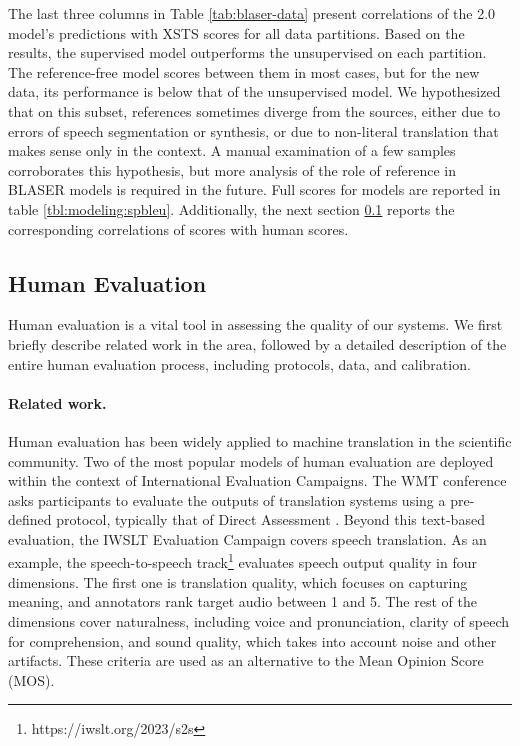 The last three columns in Table \ref{tab:blaser-data} present correlations of the 2.0 model's predictions with XSTS scores for all data partitions. Based on the results, the supervised model outperforms the unsupervised on each partition. The reference-free model scores between them in most cases, but for the new \sst data, its performance is below that of the unsupervised model. We hypothesized that on this subset, references sometimes diverge from the sources, either due to errors of speech segmentation or synthesis, or due to non-literal translation that makes sense only in the context. A manual examination of a few samples corroborates this hypothesis, but more analysis of the role of reference in BLASER models is required in the future.
Full \blaser scores for \mfourt models are reported in table \ref{tbl:modeling:spbleu}. Additionally, the next section \ref{subsec:appendix:humanmetrics} reports the corresponding correlations of \blaser scores with human scores.






\subsection{Human Evaluation}
\label{subsec:appendix:humanmetrics}


Human evaluation is a vital tool in assessing the quality of our systems. We first briefly describe related work in the area, followed by a detailed description of the entire human evaluation process, including protocols, data, and calibration. 

\paragraph{Related work.} Human evaluation has been widely applied to machine translation in the scientific community. Two of the most popular models of human evaluation are deployed within the context of International Evaluation Campaigns. The WMT conference \citep{kocmi-EtAl:2022:WMT} asks participants to evaluate the outputs of translation systems using a pre-defined protocol, typically that of Direct Assessment \citep{grahametal2013directassessment}.  
Beyond this text-based evaluation, the IWSLT Evaluation Campaign covers speech translation. As an example, the speech-to-speech track\footnote{https://iwslt.org/2023/s2s} evaluates speech output quality in four dimensions. The first one is translation quality, which focuses on capturing meaning, and annotators rank target audio between 1 and 5. The rest of the dimensions cover naturalness, including voice and pronunciation, clarity of speech for comprehension, and sound quality, which takes into account noise and other artifacts. These criteria are used as an alternative to the Mean Opinion Score (MOS).


